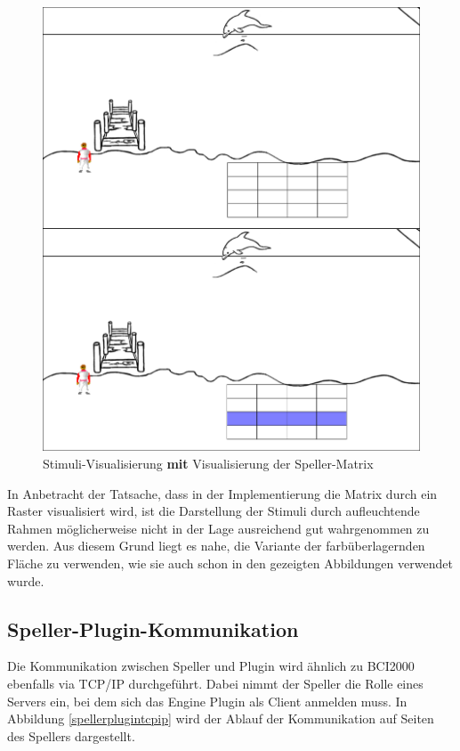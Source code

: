 \begin{figure}[h!]
\begin{center}
\includegraphics[scale=0.225]{images/Mesh.png}
\caption{Stimuli-Visualisierung \textbf{mit} Visualisierung der Speller-Matrix}
\label{Mesh}
\end{center}
\end{figure}

In Anbetracht der Tatsache, dass in der Implementierung die Matrix durch ein Raster visualisiert wird, 
ist die Darstellung der Stimuli durch aufleuchtende Rahmen möglicherweise nicht in der Lage ausreichend gut wahrgenommen zu werden.
Aus diesem Grund liegt es nahe, die Variante der farbüberlagernden Fläche zu verwenden, wie sie auch schon in den gezeigten Abbildungen verwendet wurde.

\pagebreak
\subsection{Speller-Plugin-Kommunikation}
\vspace{0.3cm}

Die Kommunikation zwischen Speller und Plugin wird ähnlich zu BCI2000 ebenfalls via TCP/IP durchgeführt.
Dabei nimmt der Speller die Rolle eines Servers ein, bei dem sich das Engine Plugin als Client anmelden muss.
In Abbildung \ref{spellerplugintcpip} wird der Ablauf der Kommunikation auf Seiten des Spellers dargestellt.\\

